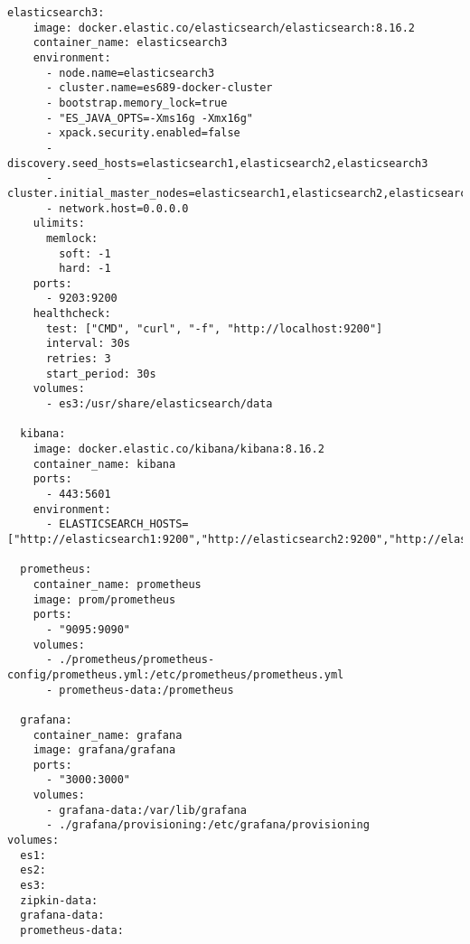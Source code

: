 \begin{lstlisting}[frame=tb,caption={Docker compose for metrics collection},label=lst:dockercomposemetrics]
  elasticsearch3:
    image: docker.elastic.co/elasticsearch/elasticsearch:8.16.2
    container_name: elasticsearch3
    environment:
      - node.name=elasticsearch3
      - cluster.name=es689-docker-cluster
      - bootstrap.memory_lock=true
      - "ES_JAVA_OPTS=-Xms16g -Xmx16g"
      - xpack.security.enabled=false
      - discovery.seed_hosts=elasticsearch1,elasticsearch2,elasticsearch3
      - cluster.initial_master_nodes=elasticsearch1,elasticsearch2,elasticsearch3
      - network.host=0.0.0.0
    ulimits:
      memlock:
        soft: -1
        hard: -1
    ports:
      - 9203:9200
    healthcheck:
      test: ["CMD", "curl", "-f", "http://localhost:9200"]
      interval: 30s
      retries: 3
      start_period: 30s
    volumes:
      - es3:/usr/share/elasticsearch/data

  kibana:
    image: docker.elastic.co/kibana/kibana:8.16.2
    container_name: kibana
    ports:
      - 443:5601
    environment:
      - ELASTICSEARCH_HOSTS=["http://elasticsearch1:9200","http://elasticsearch2:9200","http://elasticsearch3:9200"]

  prometheus:
    container_name: prometheus
    image: prom/prometheus
    ports:
      - "9095:9090"
    volumes:
      - ./prometheus/prometheus-config/prometheus.yml:/etc/prometheus/prometheus.yml
      - prometheus-data:/prometheus

  grafana:
    container_name: grafana
    image: grafana/grafana
    ports:
      - "3000:3000"
    volumes:
      - grafana-data:/var/lib/grafana
      - ./grafana/provisioning:/etc/grafana/provisioning
volumes:
  es1:
  es2:
  es3:
  zipkin-data:
  grafana-data:
  prometheus-data:
\end{lstlisting}